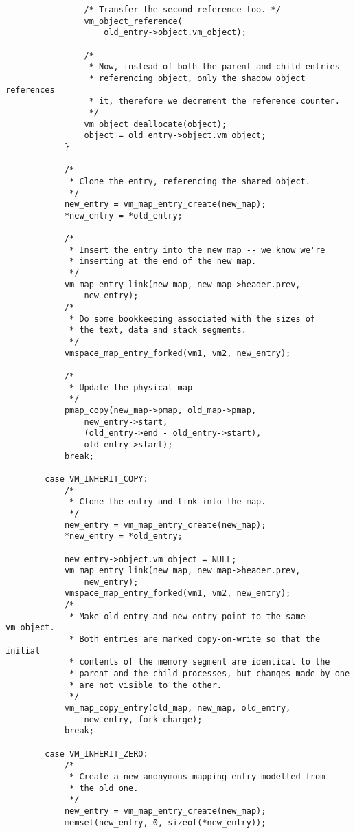 \documentclass[shortabstract, english]{iithesis}
\newenvironment{code}{}{}
\begin{document}
\begin{code}
\begin{verbatim}
                /* Transfer the second reference too. */
                vm_object_reference(
                    old_entry->object.vm_object);

                /*
                 * Now, instead of both the parent and child entries
                 * referencing object, only the shadow object references
                 * it, therefore we decrement the reference counter.
                 */
                vm_object_deallocate(object);
                object = old_entry->object.vm_object;
            }

            /*
             * Clone the entry, referencing the shared object.
             */
            new_entry = vm_map_entry_create(new_map);
            *new_entry = *old_entry;

            /*
             * Insert the entry into the new map -- we know we're
             * inserting at the end of the new map.
             */
            vm_map_entry_link(new_map, new_map->header.prev,
                new_entry);
            /*
             * Do some bookkeeping associated with the sizes of
             * the text, data and stack segments.
             */
            vmspace_map_entry_forked(vm1, vm2, new_entry);

            /*
             * Update the physical map
             */
            pmap_copy(new_map->pmap, old_map->pmap,
                new_entry->start,
                (old_entry->end - old_entry->start),
                old_entry->start);
            break;

        case VM_INHERIT_COPY:
            /*
             * Clone the entry and link into the map.
             */
            new_entry = vm_map_entry_create(new_map);
            *new_entry = *old_entry;

            new_entry->object.vm_object = NULL;
            vm_map_entry_link(new_map, new_map->header.prev,
                new_entry);
            vmspace_map_entry_forked(vm1, vm2, new_entry);
            /*
             * Make old_entry and new_entry point to the same vm_object.
             * Both entries are marked copy-on-write so that the initial
             * contents of the memory segment are identical to the
             * parent and the child processes, but changes made by one
             * are not visible to the other.
             */
            vm_map_copy_entry(old_map, new_map, old_entry,
                new_entry, fork_charge);
            break;

        case VM_INHERIT_ZERO:
            /*
             * Create a new anonymous mapping entry modelled from
             * the old one.
             */
            new_entry = vm_map_entry_create(new_map);
            memset(new_entry, 0, sizeof(*new_entry));


\end{verbatim}
\end{code}
\end{document}
